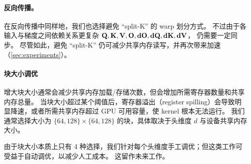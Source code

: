 \paragraph{反向传播。}
在反向传播中同样地，我们也选择避免 “split-K” 的 warp 划分方式。
不过由于各输入与梯度之间依赖关系更复杂
$\mathbf{Q}, \mathbf{K}, \mathbf{V}, \mathbf{O}, \mathbf{dO}, \mathbf{dQ}, \mathbf{dK}, \mathbf{dV}$，
仍需要一定同步。
尽管如此，避免 “split-K” 仍可减少共享内存读写，并再次带来加速（\cref{sec:experiments}）。

\paragraph{块大小调优}
增大块大小通常会减少共享内存加载/存储次数，但会增加所需寄存器数量和共享内存总量。
当块大小超过某个阈值后，寄存器溢出（register spilling）会导致明显降速，或者所需共享内存超过 GPU 可用容量，使 kernel 根本无法运行。
我们通常选择大小为 $\{64, 128\} \times \{64, 128\}$ 的块，具体取决于头维度 $d$ 与设备共享内存大小。

由于块大小本质上只有 4 种选择，我们针对每个头维度手工调优；但这类工作可受益于自动调优，以减少人工成本。
这留作未来工作。
